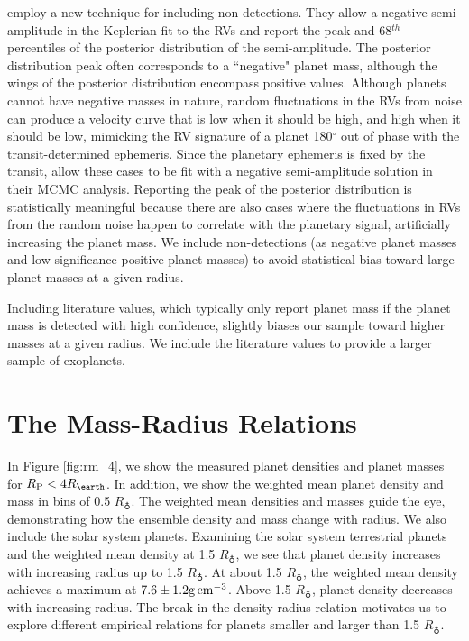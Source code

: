\documentclass[iop]{emulateapj}
\newcommand{\gcmc}{\ensuremath{\rm g\,cm^{-3}}}
\newcommand{\gcc}{\gcmc}
\newcommand{\rpl}{\ensuremath{R_{\rm P}}}
\newcommand{\rearth}{\ensuremath{R_\earth}}
\begin{document}
\citet{Marcy2014} employ a new technique for including non-detections.  They allow  a negative semi-amplitude in the Keplerian fit to the RVs and report the peak and 68$^{th}$ percentiles of the posterior distribution of the semi-amplitude.  The posterior distribution peak often corresponds to a ``negative" planet mass, although the wings of the posterior distribution encompass positive values.  Although planets cannot have negative masses in nature, random fluctuations in the RVs from noise can produce a velocity curve that is low when it should be high, and high when it should be low, mimicking the RV signature of a planet 180$^\circ$ out of phase with the transit-determined ephemeris.  Since the planetary ephemeris is fixed by the transit, \citet{Marcy2014} allow these cases to be fit with a negative semi-amplitude solution in their MCMC analysis.  Reporting the peak of the posterior distribution is statistically meaningful because there are also cases where the fluctuations in RVs from the random noise happen to correlate with the planetary signal, artificially increasing the planet mass.  We include non-detections (as negative planet masses and low-significance positive planet masses) to avoid statistical bias toward large planet masses at a given radius.

Including literature values, which typically only report planet mass if the planet mass is detected with high confidence, slightly biases our sample toward higher masses at a given radius.  We include the literature values to provide a larger sample of exoplanets.

\section{The Mass-Radius Relations}
In Figure \ref{fig:rm_4}, we show the measured planet densities and planet masses for $\rpl < 4 \rearth$.  In addition, we show the weighted mean planet density and mass in bins of 0.5 \rearth.  The weighted mean densities and masses guide the eye, demonstrating how the ensemble density and mass change with radius.  We also include the solar system planets.  Examining the solar system terrestrial planets and the weighted mean density at 1.5 \rearth, we see that planet density increases with increasing radius up to 1.5 \rearth.  At about 1.5 \rearth, the weighted mean density achieves a maximum at $7.6\pm1.2 \gcc$.  Above 1.5 \rearth, planet density decreases with increasing radius.  The break in the density-radius relation motivates us to explore different empirical relations for planets smaller and larger than 1.5 \rearth.
\end{document}
